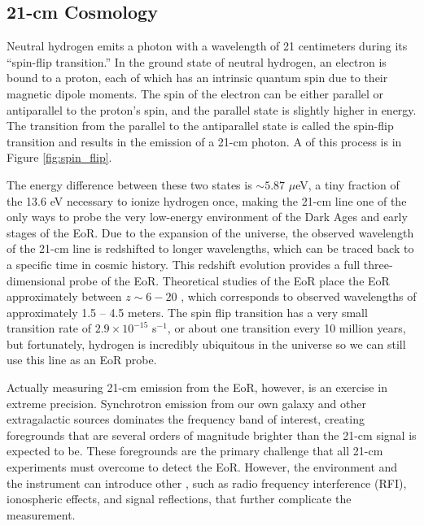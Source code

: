 \documentclass[12pt]{article}
\begin{document}
\subsection{21-cm Cosmology} \label{subsec:21cm}

Neutral hydrogen emits a photon with a wavelength of 21 centimeters during its ``spin-flip transition.'' In the ground state of neutral hydrogen, an electron is bound to a proton, each of which has an intrinsic quantum spin due to their magnetic dipole moments. The spin of the electron can be either parallel or antiparallel to the proton's spin, and the parallel state is slightly higher in energy. The transition from the parallel to the antiparallel state is called the spin-flip transition and results in the emission of a 21-cm photon. A  of this process is in Figure \ref{fig:spin_flip}.

The energy difference between these two states is $\sim 5.87$ $\mu$eV, a tiny fraction of the 13.6 eV necessary to ionize hydrogen once, making the 21-cm line one of the only ways to probe the very low-energy environment of the Dark Ages and early stages of the EoR. Due to the expansion of the universe, the observed wavelength of the 21-cm line is redshifted to longer wavelengths, which can be traced back to a specific time in cosmic history. This redshift evolution provides a full three-dimensional probe of the EoR. Theoretical studies of the EoR place the EoR approximately between $z \sim 6 - 20$ , which corresponds to observed wavelengths of approximately 1.5 -- 4.5 meters. The spin flip transition has a very small transition rate of $2.9 \times 10^{-15}$ s$^{-1}$, or about one transition every 10 million years, but fortunately, hydrogen is incredibly ubiquitous in the universe so we can still use this line as an EoR probe.

Actually measuring 21-cm emission from the EoR, however, is an exercise in extreme precision. Synchrotron emission from our own galaxy and other extragalactic sources dominates the frequency band of interest, creating foregrounds that are several orders of magnitude brighter than the 21-cm signal is expected to be. These foregrounds are the primary challenge that all 21-cm experiments must overcome to detect the EoR. However, the environment and the instrument can introduce other , such as radio frequency interference (RFI), ionospheric effects, and signal reflections, that further complicate the measurement.
\end{document}
